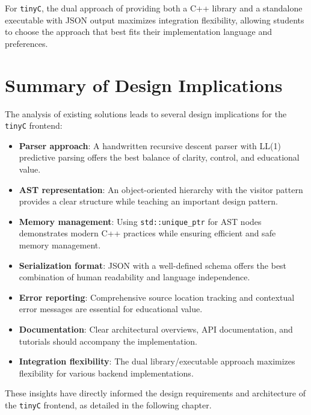 For \texttt{tinyC}, the dual approach of providing both a C++ library and a standalone executable with JSON output maximizes integration flexibility, allowing students to choose the approach that best fits their implementation language and preferences.

\section{Summary of Design Implications}

The analysis of existing solutions leads to several design implications for the \texttt{tinyC} frontend:

\begin{itemize}
    \item \textbf{Parser approach}: A handwritten recursive descent parser with LL(1) predictive parsing offers the best balance of clarity, control, and educational value.
    \item \textbf{AST representation}: An object-oriented hierarchy with the visitor pattern provides a clear structure while teaching an important design pattern.
    \item \textbf{Memory management}: Using \texttt{std::unique\_ptr} for AST nodes demonstrates modern C++ practices while ensuring efficient and safe memory management.
    \item \textbf{Serialization format}: JSON with a well-defined schema offers the best combination of human readability and language independence.
    \item \textbf{Error reporting}: Comprehensive source location tracking and contextual error messages are essential for educational value.
    \item \textbf{Documentation}: Clear architectural overviews, API documentation, and tutorials should accompany the implementation.
    \item \textbf{Integration flexibility}: The dual library/executable approach maximizes flexibility for various backend implementations.
\end{itemize}

These insights have directly informed the design requirements and architecture of the \texttt{tinyC} frontend, as detailed in the following chapter.